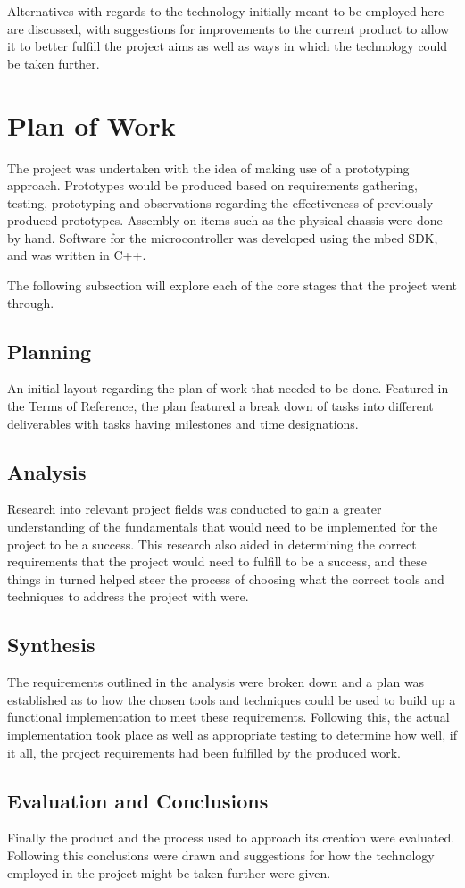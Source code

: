	Alternatives with regards to the technology initially meant to be employed here are discussed, with suggestions for improvements to the current product to allow it to better fulfill the project aims as well as ways in which the technology could be taken further.
	
	\section{Plan of Work}
	The project was undertaken with the idea of making use of a prototyping approach. Prototypes would be produced based on requirements gathering, testing, prototyping and observations regarding the effectiveness of previously produced prototypes. Assembly on items such as the physical chassis were done by hand. Software for the microcontroller was developed using the mbed SDK, and was written in C++.
	
	The following subsection will explore each of the core stages that the project went through.
		\subsection{Planning}
		An initial layout regarding the plan of work that needed to be done. Featured in the Terms of Reference, the plan featured a break down of tasks into different deliverables with tasks having milestones and time designations.
		
		\subsection{Analysis}
		Research into relevant project fields was conducted to gain a greater understanding of the fundamentals that would need to be implemented for the project to be a success. This research also aided in determining the correct requirements that the project would need to fulfill to be a success, and these things in turned helped steer the process of choosing what the correct tools and techniques to address the project with were.
		
		\subsection{Synthesis}
		The requirements outlined in the analysis were broken down and a plan was established as to how the chosen tools and techniques could be used to build up a functional implementation to meet these requirements. Following this, the actual implementation took place as well as appropriate testing to determine how well, if it all, the project requirements had been fulfilled by the produced work.
		
		\subsection{Evaluation and Conclusions}
		Finally the product and the process used to approach its creation were evaluated. Following this conclusions were drawn and suggestions for how the technology employed in the project might be taken further were given.
		
		

